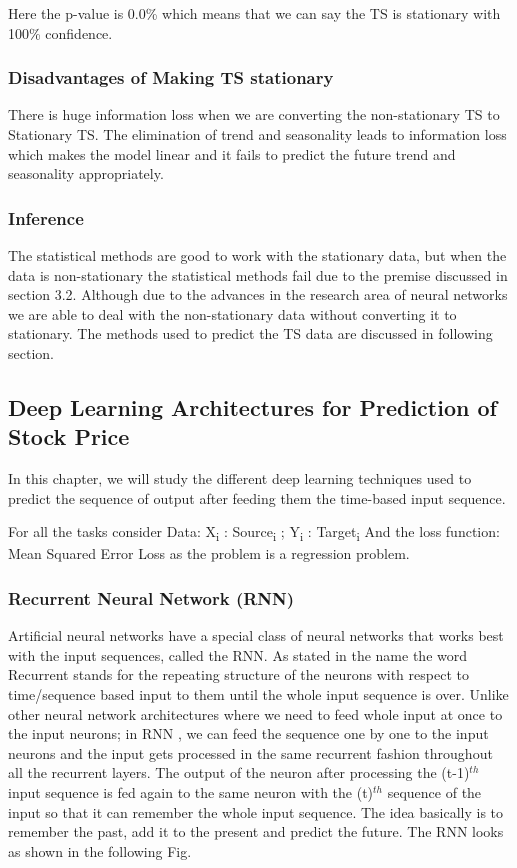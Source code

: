 			Here the p-value is 0.0\% which means that we can say the TS is stationary with 100\% confidence.


	\subsubsection{Disadvantages of Making TS stationary}

		There is huge information loss when we are converting the non-stationary TS to Stationary TS. The elimination of trend and seasonality leads to information loss which makes the model linear and it fails to predict the future trend and seasonality appropriately. 

	\subsubsection{Inference}

		The statistical methods are good to work with the stationary data, but when the data is non-stationary the statistical methods fail due to the premise discussed in section 3.2. Although due to the advances in the research area of neural networks we are able to deal with the non-stationary data without converting it to stationary. The methods used to predict the TS data are discussed in following section.


\subsection{Deep Learning Architectures for Prediction of Stock Price}

In this chapter, we will study the different deep learning techniques used to predict the sequence of output after feeding them the time-based input sequence. 

For all the tasks consider
Data: {X\textsubscript{i} : Source\textsubscript{i} ; Y\textsubscript{i} : Target\textsubscript{i} }
And the loss function: Mean Squared Error Loss as the problem is a regression problem. 

\subsubsection{Recurrent Neural Network (RNN)}

Artificial neural networks have a special class of neural networks that works best with the input sequences, called the RNN. As stated in the name the word Recurrent stands for the repeating structure of the neurons with respect to time/sequence based input to them until the whole input sequence is over. Unlike other neural network architectures where we need to feed whole input at once to the input neurons; in RNN \cite{12}, we can feed the sequence one by one to the input neurons and the input gets processed in the same recurrent fashion throughout all the recurrent layers. The output of the neuron after processing the (t-1)$^{th}$ input sequence is fed again to the same neuron with the (t)$^{th}$ sequence of the input so that it can remember the whole input sequence. The idea basically is to remember the past, add it to the present and predict the future. The RNN looks as shown in the following Fig.

